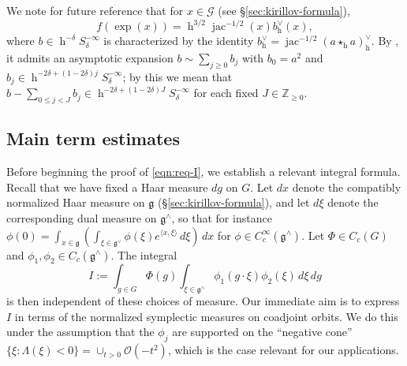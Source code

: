 \documentclass[reqno,10pt]{amsart}
\theoremstyle{plain} %
\theoremstyle{definition}
\theoremstyle{plain} %
\theoremstyle{remark}
\theoremstyle{itplain} %
\theoremstyle{remark} %
\renewcommand{\geq}{\geqslant}
\renewcommand{\leq}{\leqslant}
\numberwithin{equation}{section}
\DeclareMathOperator{\h}{h}
\DeclareMathOperator{\jac}{jac}
\begin{document}
We note for future reference that for $x \in \mathcal{G}$ (see \S\ref{sec:kirillov-formula}),
\[
  f(\exp(x)) = \h^{3/2} \jac^{-1/2}(x) b^\vee_{\h}(x),
\]
where $b \in \h^{-\delta} S^{-\infty}_{\delta}$ is characterized by the identity $b_{\h}^{\vee} = \jac^{-1/2} (a \star_{\h} a)_{\h}^\vee$.  By \cite[\S7.8]{nelson-venkatesh-1}, it admits an asymptotic expansion $b \sim \sum_{j \geq 0} b_j$ with $b_0 = a^2$ and $b_j \in \h^{-2 \delta + (1 - 2 \delta) j} S^{-\infty}_{\delta}$; by this we mean that $b - \sum_{0 \leq j < J} b_j \in \h^{- 2 \delta + (1 - 2 \delta )J} S^{-\infty}_{\delta}$ for each fixed $J \in \mathbb{Z}_{\geq 0}$.



\subsection{Main term estimates}
\label{sec:orge0a88b2}
Before beginning the proof of \eqref{eqn:req-I}, we establish a relevant integral formula.  Recall that we have fixed a Haar measure $d g$ on $G$.  Let $d x$ denote the compatibly normalized Haar measure on $\mathfrak{g}$ (\S\ref{sec:kirillov-formula}), and let $d \xi$ denote the corresponding dual measure on $\mathfrak{g}^\wedge$, so that for instance $\phi(0) = \int_{x \in \mathfrak{g}} (\int_{\xi \in \mathfrak{g}^\vee} \phi(\xi) e^{\langle x, \xi \rangle}\, d \xi ) \, dx$ for $\phi \in C_c^\infty(\mathfrak{g}^\wedge)$.  Let $\Phi \in C_c(G)$ and $\phi_1,\phi_2 \in C_c(\mathfrak{g}^\wedge)$.  The integral
\begin{equation*}
  I := \int_{g \in G} \Phi(g) \int_{\xi \in \mathfrak{g}^\wedge} \phi_1(g \cdot \xi) \phi_2(\xi) \, d \xi \, d g
\end{equation*}
is then independent of these choices of measure.  Our immediate aim is to express $I$ in terms of the normalized symplectic measures on coadjoint orbits.  We do this under the assumption that the $\phi_j$ are supported on the ``negative cone'' $\{\xi : \Lambda(\xi) < 0\} = \cup_{t > 0} \mathcal{O}(-t^2)$, which is the case relevant for our applications.
\end{document}
